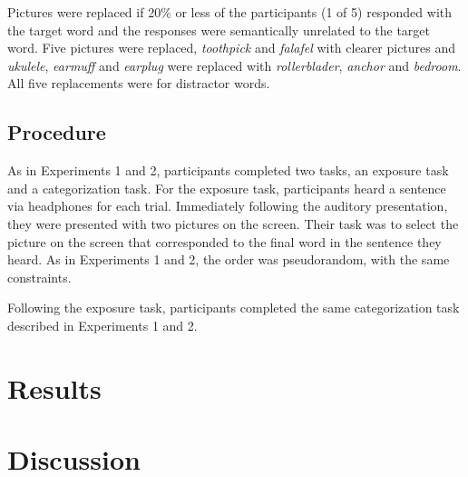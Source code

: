 Pictures were replaced if 20\% or less of the participants (1 of 5) responded with the target word and the responses were semantically unrelated to the target word. Five pictures were replaced, \emph{toothpick} and \emph{falafel} with clearer pictures and \emph{ukulele}, \emph{earmuff} and \emph{earplug} were replaced with \emph{rollerblader}, \emph{anchor} and \emph{bedroom}.  All five replacements were for distractor words.

\subsection{Procedure}

As in Experiments 1 and 2, participants completed two tasks, an exposure task and a categorization task.  For the exposure task, participants heard a sentence via headphones for each trial.  Immediately following the auditory presentation, they were presented with two pictures on the screen.  Their task was to select the picture on the screen that corresponded to the final word in the sentence they heard.  As in Experiments 1 and 2, the order was pseudorandom, with the same constraints.

Following the exposure task, participants completed the same categorization task described in Experiments 1 and 2.

\section{Results}

\section{Discussion}
